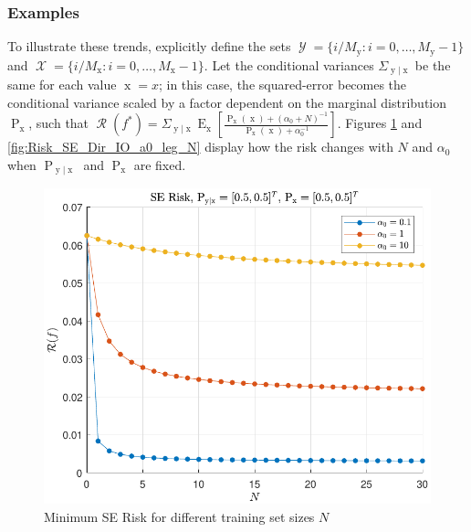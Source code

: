 \documentclass{article}
\DeclareMathOperator{\xrm}{\mathrm{x}}
\DeclareMathOperator{\yrm}{\mathrm{y}}
\DeclareMathOperator{\Prm}{\mathrm{P}}
\DeclareMathOperator{\Erm}{\mathrm{E}}
\DeclareMathOperator{\Xcal}{\mathcal{X}}
\DeclareMathOperator{\Ycal}{\mathcal{Y}}
\DeclareMathOperator{\Rcal}{\mathcal{R}}
\begin{document}
\subsubsection{Examples}

To illustrate these trends, explicitly define the sets $\Ycal = \{ i/M_{\yrm} : i = 0,\ldots,M_{\yrm}-1 \}$ and $\Xcal = \{ i/M_{\xrm} : i = 0,\ldots,M_{\xrm}-1 \}$. Let the conditional variances $\Sigma_{\yrm | \xrm}$ be the same for each value $\xrm = x$; in this case, the squared-error becomes the conditional variance scaled by a factor dependent on the marginal distribution $\Prm_{\xrm}$, such that $\Rcal(f^*) = \Sigma_{\yrm | \xrm} \Erm_{\xrm} \left[ \frac{\Prm_{\xrm}(\xrm) + (\alpha_0+N)^{-1}}{\Prm_{\xrm}(\xrm) + \alpha_0^{-1}} \right]$.  Figures \ref{fig:Risk_SE_Dir_IO_N_leg_a0} and \ref{fig:Risk_SE_Dir_IO_a0_leg_N} display how the risk changes with $N$ and $\alpha_0$ when $\Prm_{\yrm|\xrm}$ and $\Prm_{\xrm}$ are fixed.

\begin{figure}
\centering
\includegraphics[width=1.0\linewidth]{Risk_SE_Dir_IO_N_leg_a0.pdf}
\caption{Minimum SE Risk for different training set sizes $N$}
\label{fig:Risk_SE_Dir_IO_N_leg_a0}
\end{figure}
\end{document}
